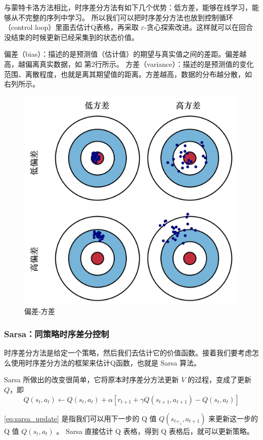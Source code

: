 与蒙特卡洛方法相比，时序差分方法有如下几个优势：低方差，能够在线学习，能够从不完整的序列中学习。
所以我们可以把时序差分方法也放到控制循环（control loop）里面去估计Q表格，再采取 $\varepsilon$-贪心探索改进。这样就可以在回合没结束的时候更新已经采集到的状态价值。  

\begin{tcolorbox}[colframe=blue!25,colback=blue!10]
偏差（bias）：描述的是预测值（估计值）的期望与真实值之间的差距。偏差越高，越偏离真实数据，如 第2行所示。
方差（variance）：描述的是预测值的变化范围、离散程度，也就是离其期望值的距离。方差越高，数据的分布越分散，如 右列所示。
\end{tcolorbox}
\begin{figure}[htb]
	\centering
	\includegraphics[width=0.3\linewidth]{res/ch3/bias_variance.png}
	\caption{偏差-方差}
	\label{fig:bias_variance}
\end{figure}

\subsubsection{Sarsa：同策略时序差分控制} 

时序差分方法是给定一个策略，然后我们去估计它的价值函数。接着我们要考虑怎么使用时序差分方法的框架来估计Q函数，也就是 Sarsa 算法。

Sarsa 所做出的改变很简单，它将原本时序差分方法更新 $V$ 的过程，变成了更新 $Q$，即
\begin{equation}
	Q\left(s_{t}, a_{t}\right) \leftarrow Q\left(s_{t}, a_{t}\right)+\alpha\left[r_{t+1}+\gamma Q\left(s_{t+1}, a_{t+1}\right)-Q\left(s_{t}, a_{t}\right)\right]
	\label{eq:sarsa_update}
\end{equation}

\eqref{eq:sarsa_update} 是指我们可以用下一步的 Q 值 $Q(s_{t+_1},a_{t+1})$ 来更新这一步的 Q 值 $Q(s_t,a_t)$ 。
Sarsa 直接估计 Q 表格，得到 Q 表格后，就可以更新策略。

